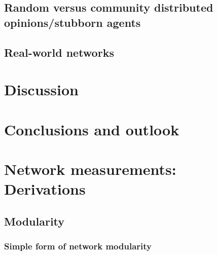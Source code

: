 \documentclass[11 pt , letterpaper , twoside , openright]{book}
\begin{document}
\section{Random versus community distributed opinions/stubborn agents}

\section{Real-world networks}

\chapter{Discussion}


\chapter{Conclusions and outlook}
\newpage

\pagestyle{fancy}
\fancyhf{}
\lhead{\textcolor{NavyBlue}{\appendixname} \ \textcolor{NavyBlue}{\thechapter}}
\rhead{\rightmark}
\cfoot{\thepage}

\appendix
\addappheadtotoc 

\chapter{Network measurements: Derivations}
\section{Modularity}\label{modul}
\subsection{Simple form of network modularity}\label{simplemod}
\end{document}
